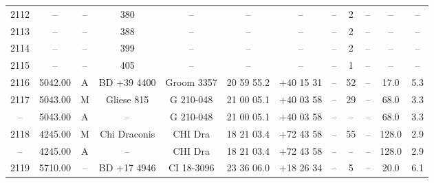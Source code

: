 \begin{table}
\begin{tabular}{cccccccccccc}
2112 & -- & -- & 380 & -- & -- & -- & -- & 2 & -- & -- & -- \\
2113 & -- & -- & 388 & -- & -- & -- & -- & 2 & -- & -- & -- \\
2114 & -- & -- & 399 & -- & -- & -- & -- & 2 & -- & -- & -- \\
2115 & -- & -- & 405 & -- & -- & -- & -- & 1 & -- & -- & -- \\
2116 & 5042.00 & A & BD +39 4400 & Groom 3357 & 20 59 55.2 & +40 15 31 & -- & 52 & -- & 17.0 & 5.3 \\
2117 & 5043.00 & M & Gliese 815 & G 210-048 & 21 00 05.1 & +40 03 58 & -- & 29 & -- & 68.0 & 3.3 \\
-- & 5043.00 & A & -- & G 210-048 & 21 00 05.1 & +40 03 58 & -- & -- & -- & 68.0 & 3.3 \\
2118 & 4245.00 & M & Chi Draconis & CHI Dra & 18 21 03.4 & +72 43 58 & -- & 55 & -- & 128.0 & 2.9 \\
-- & 4245.00 & A & -- & CHI Dra & 18 21 03.4 & +72 43 58 & -- & -- & -- & 128.0 & 2.9 \\
2119 & 5710.00 & -- & BD +17 4946 & CI 18-3096 & 23 36 06.0 & +18 26 34 & -- & 5 & -- & 20.0 & 6.1 \\
\end{tabular}
\end{table}
